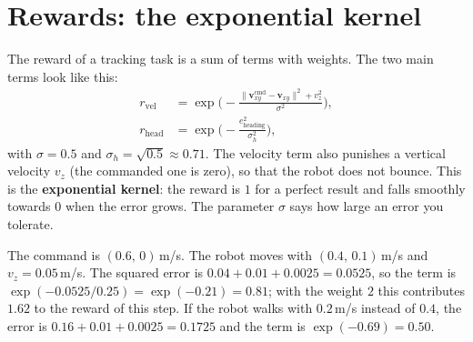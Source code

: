 \section*{Rewards: the exponential kernel}
The reward of a tracking task is a sum of terms with weights. The two main terms look like this:
\begin{align*}
r_{\text{vel}}&=\exp\!\Big(-\frac{\|\mathbf v^{\text{cmd}}_{xy}-\mathbf v_{xy}\|^2+v_z^2}{\sigma^2}\Big),\\
r_{\text{head}}&=\exp\!\Big(-\frac{e_{\text{heading}}^2}{\sigma_h^2}\Big),
\end{align*}
with $\sigma=0.5$ and $\sigma_h=\sqrt{0.5}\approx0.71$. The velocity term also punishes a vertical velocity $v_z$ (the commanded one is zero), so that the robot does not bounce. This is the \textbf{exponential kernel}: the reward is $1$ for a perfect result and falls smoothly towards $0$ when the error grows. The parameter $\sigma$ says how large an error you tolerate.

\begin{center}
\end{center}

\begin{example}
The command is $(0.6,\,0)$\,m/s. The robot moves with $(0.4,\,0.1)$\,m/s and $v_z=0.05$\,m/s. The squared error is $0.04+0.01+0.0025=0.0525$, so the term is $\exp(-0.0525/0.25)=\exp(-0.21)=0.81$; with the weight $2$ this contributes $1.62$ to the reward of this step. If the robot walks with $0.2$\,m/s instead of $0.4$, the error is $0.16+0.01+0.0025=0.1725$ and the term is $\exp(-0.69)=0.50$.
\end{example}


